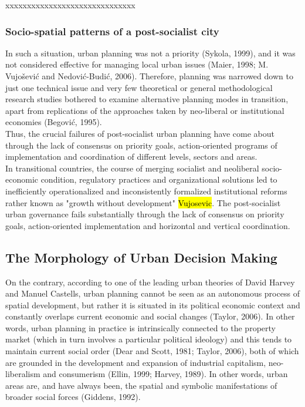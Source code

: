 \documentclass[11pt]{report}
\begin{document}
xxxxxxxxxxxxxxxxxxxxxxxxxxxxxx

\subsubsection{Socio-spatial patterns of a post-socialist city}
In such a situation, urban planning was not a priority (Sykola, 1999), and it was not considered effective for managing local urban issues (Maier, 1998; M. Vujošević and Nedović-Budić, 2006). Therefore, planning was narrowed down to just one technical issue and very few theoretical or general methodological research studies bothered to examine alternative planning modes in transition, apart from replications of the approaches taken by neo-liberal or institutional economies (Begović, 1995).
\\
Thus, the crucial failures of post-socialist urban planning have come about through the lack of consensus on priority goals, action-oriented programs of implementation and coordination of different levels, sectors and areas. 
\\
In transitional countries, the course of merging socialist and neoliberal socio-economic condition, regulatory practices and organizational solutions led to inefficiently operationalized and inconsistently formalized institutional reforms rather known as "growth without development" \hl{Vujosevic}.
The post-socialist urban governance fails substantially through the lack of consensus on priority goals, action-oriented implementation and horizontal and vertical coordination.
\\

\subsection{The Morphology of Urban Decision Making}
On the contrary, according to one of the leading urban theories of David Harvey and Manuel Castells, urban planning cannot be seen as an autonomous process of spatial development, but rather it is situated in its political economic context and constantly overlaps current economic and social changes  (Taylor, 2006). In other words, urban planning in practice is intrinsically connected to the property market (which in turn involves a particular political ideology) and this tends to maintain current social order (Dear and Scott, 1981; Taylor, 2006), both of which are grounded in the development and expansion of industrial capitalism, neo-liberalism and consumerism (Ellin, 1999; Harvey, 1989). In other words, urban areas are, and have always been, the spatial and symbolic manifestations of broader social forces (Giddens, 1992).
\end{document}
